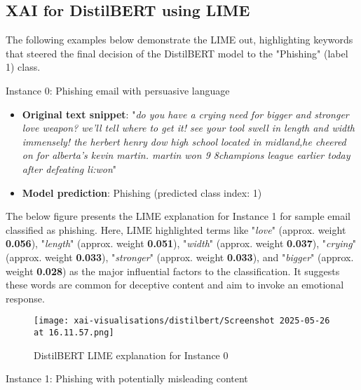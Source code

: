 
\subsection{XAI for DistilBERT using LIME}
The following examples below demonstrate the LIME out, highlighting keywords that steered the final decision of the DistilBERT model to the "Phishing" (label 1) class.\newline

\noindent Instance 0: Phishing email with persuasive language

\begin{itemize}
  \item \textbf{Original text snippet}: "\textit{do you have a crying need for bigger and stronger love weapon? we'll tell where to get it! see your tool swell in length and width immensely! the herbert henry dow high school located in midland,he cheered on for alberta's kevin martin. martin won 9 8champions league earlier today after defeating li:won}"
  \item \textbf{Model prediction}: Phishing (predicted class index: 1)
\end{itemize}

\noindent The below figure presents the LIME explanation for Instance 1 for sample email classified as phishing. Here, LIME highlighted terms like "\textit{love}" (approx. weight \textbf{0.056}), "\textit{length}" (approx. weight \textbf{0.051}), "\textit{width}" (approx. weight \textbf{0.037}), "\textit{crying}" (approx. weight \textbf{0.033}), "\textit{stronger}" (approx. weight \textbf{0.033}), and "\textit{bigger}" (approx. weight \textbf{0.028}) as the major influential factors to the classification. It suggests these words are common for deceptive content and aim to invoke an emotional response.

\newpage

\vspace{0.5cm}
\begin{figure}[H]
  \begin{center}
    \texttt{[image: xai-visualisations/distilbert/Screenshot 2025-05-26 at 16.11.57.png]}
    \caption{DistilBERT LIME explanation for Instance 0}
  \end{center}
\end{figure}

\newpage

\noindent Instance 1: Phishing with potentially misleading content

